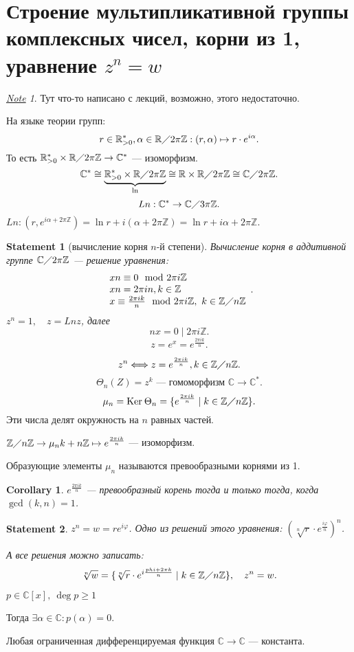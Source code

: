 \documentclass[11pt]{book}
\newcommand{\Z}{\mathbb{Z}}
\newcommand{\R}{\mathbb{R}}
\newcommand{\Cm}{\mathbb{C}}
\renewcommand{\ge}{\geqslant}
\renewcommand{\ker}{{\mathop{\text{\rm Ker}}}\:}
\theoremstyle{definition}
\theoremstyle{plain}
\theoremstyle{plain}
\newtheorem{st}{Statement}
\newtheorem{cor}{Corollary}
\theoremstyle{definition}
\theoremstyle{remark}
\newtheorem*{note}{\underline{Note}}
\begin{document}
\section{Строение мультипликативной группы комплексных чисел, корни из 1, уравнение $ z^{n} = w$}
\begin{note}
    Тут что-то написано с лекций, возможно, этого недостаточно.
\end{note}
    На языке теории групп:
    \[
	r \in  \R^{*}_{>0} , \alpha  \in  \R\diagup 2 \pi \Z: (r, \alpha ) \mapsto r \cdot e ^{i \alpha} 
    .\] 
    То есть  $\R^{*}_{>0} \times  \R\diagup 2\pi\Z \to  \Cm ^{*}$ --- изоморфизм.
    \[
	\Cm^{*} \cong \underbrace{\R^{*}_{>0} \times  \R\diagup 2\pi\Z}_{\ln} \cong \R \times  \R\diagup 2\pi \Z \cong \Cm\diagup 2\pi\Z
    .\] 
    \[
    Ln: \Cm^{*} \to  \Cm\diagup 3\pi\Z
    .\] 
    $Ln: (r, e^{i\alpha + 2\pi\Z}) = \ln r + i (\alpha + 2\pi\Z)= \ln r + i \alpha  + 2\pi\Z$.
\begin{st}[вычисление корня $n$-й степени]
    Вычисление корня в аддитивной  группе $\Cm\diagup 2\pi\Z$  --- решение уравнения:
    \[
	\begin{array}{l}
	xn \equiv 0 \mod 2\pi i \Z\\
	xn = 2\pi i n, k \in  \Z \\
	x \equiv \frac{2\pi i k}{n} \mod 2\pi i \Z, ~ k \in  \Z\diagup n\Z
	\end{array}
    .\] 
    $z ^{n} = 1, \quad z = Ln z$,  далее
    \[
    nx = 0 \mid 2\pi i \Z
    .\] 
    \[
	z = e^{x}=e ^{\frac{2\pi ik}{n}}
    .\] 
\end{st}
\[
    z^{n} \Longleftrightarrow z = e^{\frac{2 \pi  i k}{n}}, k \in  \Z \diagup n\Z
.\] 
\[
    \Theta_n (Z) = z^{k} \text{ --- гомоморфизм }  \Cm \to  \Cm^{*}
.\] 
\[
    \mu_n = \ker \Theta_n = \{e ^{ \frac{2\pi i k}{n}} \mid k \in  \Z\diagup n\Z\}
.\] 
Эти числа делят окружность на $ n$ равных частей.

$ \Z \diagup  n \Z \to  \mu_n\\
k + n\Z \mapsto e ^{\frac{2\pi i k}{n}}$ --- изоморфизм.
\begin{defn}
    Образующие элементы $ \mu_n$ называются превообразными корнями из 1.
\end{defn}
\begin{cor}
    $ e^{\frac{2\pi i k}{n}}$ --- превообразный корень тогда и только тогда, когда $ \gcd(k, n) = 1$.
\end{cor}
\begin{st}
    $ z^{n} = w = r e^{i \varphi }$.
    Одно из решений этого уравнения: $ \left( \sqrt[n]{r} \cdot e ^{\frac{i \varphi }{n}} \right)^{n} $.

    А все решения можно записать:
    \[
	\sqrt[n]{w} = \{\sqrt[n]{r} \cdot e ^{i \frac{phi  + 2 \pi k}{n}} \mid k \in  \Z\diagup n\Z\}, \quad z^{n} = w
    .\] 
\end{st}
\begin{thm}
    $ p \in  \Cm[x], ~ \deg p \ge 1$

    Тогда $ \exists \alpha  \in  \Cm: p( \alpha ) = 0$.
\end{thm}
\begin{thm}[Лиувилль]
    Любая ограниченная дифференцируемая функция $ \Cm \to  \Cm$ --- константа.
\end{thm}
\end{document}
